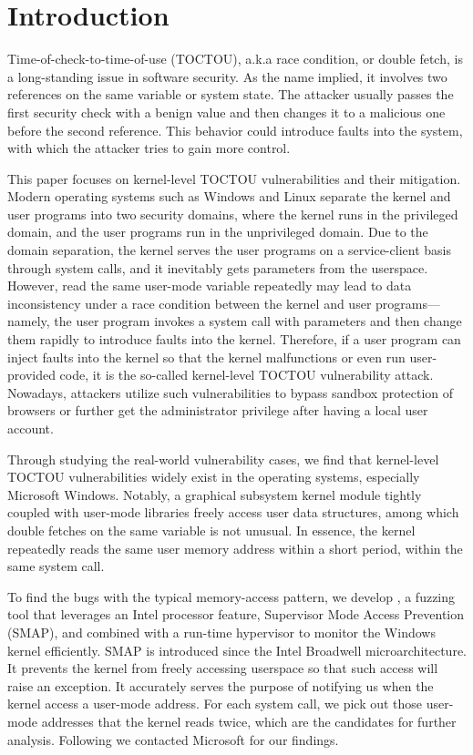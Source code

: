 
\section{Introduction}
\label{sec:ktoctou-introduction}

Time-of-check-to-time-of-use (TOCTOU), a.k.a race condition, or double fetch, is a long-standing issue in software security. As the name implied, it involves two references on the same variable or system state. The attacker usually passes the first security check with a benign value and then changes it to a malicious one before the second reference. This behavior could introduce faults into the system, with which the attacker tries to gain more control.

This paper focuses on kernel-level TOCTOU vulnerabilities and their mitigation. Modern operating systems such as Windows and Linux separate the kernel and user programs into two security domains,  where the kernel runs in the privileged domain, and the user programs run in the unprivileged domain. Due to the domain separation, the kernel serves the user programs on a service-client basis through system calls, and it inevitably gets parameters from the userspace. However, read the same user-mode variable repeatedly may lead to data inconsistency under a race condition between the kernel and user programs---namely, the user program invokes a system call with parameters and then change them rapidly to introduce faults into the kernel. Therefore, if a user program can inject faults into the kernel so that the kernel malfunctions or even run user-provided code, it is the so-called kernel-level TOCTOU vulnerability attack.  Nowadays, attackers utilize such vulnerabilities to bypass sandbox protection of browsers or further get the administrator privilege after having a local user account.

Through studying the real-world vulnerability cases,  we find that kernel-level TOCTOU vulnerabilities widely exist in the operating systems, especially Microsoft Windows. Notably, a graphical subsystem kernel module tightly coupled with user-mode libraries freely access user data structures, among which double fetches on the same variable is not unusual. In essence, the kernel repeatedly reads the same user memory address within a short period, within the same system call.

To find the bugs with the typical memory-access pattern, we develop \toolname, a fuzzing tool that leverages an Intel processor feature, Supervisor Mode Access Prevention (SMAP), and combined with a run-time hypervisor to monitor the Windows kernel efficiently. SMAP is introduced since the Intel Broadwell microarchitecture. It prevents the kernel from freely accessing userspace so that such access will raise an exception. It accurately serves the purpose of notifying us when the kernel access a user-mode address. For each system call, we pick out those user-mode addresses that the kernel reads twice, which are the candidates for further analysis. Following we contacted Microsoft for our findings.

